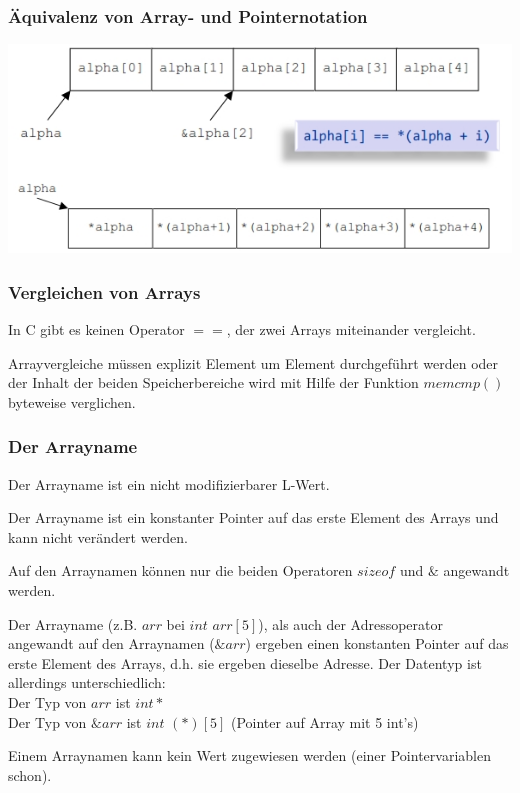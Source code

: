 		\begin{minipage}[t]{9 cm}
			\subsubsection{Äquivalenz von Array- und Pointernotation }	
				\includegraphics[width=1\textwidth]{pics/array_pointer.jpg}
				
			\subsubsection{Vergleichen von Arrays }
			\begin{compactitem}
				\item In C gibt es keinen Operator $==$, der zwei Arrays miteinander vergleicht.
				\item Arrayvergleiche müssen explizit Element um Element durchgeführt werden oder der Inhalt der beiden Speicherbereiche wird mit Hilfe der Funktion	$memcmp()$ byteweise verglichen.
			\end{compactitem}
		\end{minipage}
		\hspace*{0.5cm}
		\begin{minipage}[t]{9 cm}	
			\subsubsection{Der Arrayname }
				\begin{compactitem}
					\item Der Arrayname ist ein nicht modifizierbarer L-Wert.
					\item Der Arrayname ist ein konstanter Pointer auf das erste Element des Arrays und kann nicht verändert werden.
					\item Auf den Arraynamen können nur die beiden Operatoren $sizeof$ und $\&$ angewandt werden.
					\item Der Arrayname (z.B. $arr$ bei $int$ $arr[5]$), als auch der Adressoperator angewandt auf den Arraynamen ($\&arr$) ergeben einen konstanten Pointer auf das erste Element des Arrays, d.h. sie ergeben dieselbe Adresse. Der Datentyp ist allerdings unterschiedlich: \\
					Der Typ von $arr$ ist $int*$ \\
					Der Typ von $\&arr$ ist $int$ $(*)[5]$ (Pointer auf Array mit 5 int's)
					\item Einem Arraynamen kann kein Wert zugewiesen werden (einer Pointervariablen	schon).
				\end{compactitem}
		\end{minipage}
		
